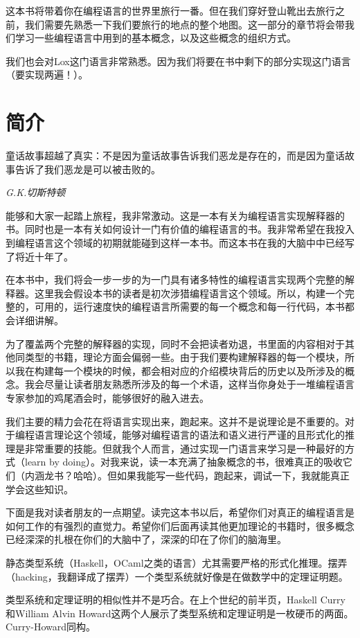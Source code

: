 \documentclass[cn,10pt,math=newtx,citestyle=gb7714-2015,bibstyle=gb7714-2015]{elegantbook}
\begin{document}
这本书将带着你在编程语言的世界里旅行一番。但在我们穿好登山靴出去旅行之前，我们需要先熟悉一下我们要旅行的地点的整个地图。这一部分的章节将会带我们学习一些编程语言中用到的基本概念，以及这些概念的组织方式。

我们也会对Lox这门语言非常熟悉。因为我们将要在书中剩下的部分实现这门语言（要实现两遍！）。

\chapter{简介}

\epigraph{童话故事超越了真实：不是因为童话故事告诉我们恶龙是存在的，而是因为童话故事告诉了我们恶龙是可以被击败的。}{\textit{G.K.切斯特顿}}

能够和大家一起踏上旅程，我非常激动。这是一本有关为编程语言实现解释器的书。同时也是一本有关如何设计一门有价值的编程语言的书。我非常希望在我投入到编程语言这个领域的初期就能碰到这样一本书。而这本书在我的大脑中中已经写了将近十年了。

在本书中，我们将会一步一步的为一门具有诸多特性的编程语言实现两个完整的解释器。这里我会假设本书的读者是初次涉猎编程语言这个领域。所以，构建一个完整的，可用的，运行速度快的编程语言所需要的每一个概念和每一行代码，本书都会详细讲解。

为了覆盖两个完整的解释器的实现，同时不会把读者劝退，书里面的内容相对于其他同类型的书籍，理论方面会偏弱一些。由于我们要构建解释器的每一个模块，所以我在构建每一个模块的时候，都会相对应的介绍模块背后的历史以及所涉及的概念。我会尽量让读者朋友熟悉所涉及的每一个术语，这样当你身处于一堆编程语言专家参加的鸡尾酒会时，能够很好的融入进去。

我们主要的精力会花在将语言实现出来，跑起来。这并不是说理论是不重要的。对于编程语言理论这个领域，能够对编程语言的语法和语义进行严谨的且形式化的推理是非常重要的技能。但就我个人而言，通过实现一门语言来学习是一种最好的方式（learn by doing）。对我来说，读一本充满了抽象概念的书，很难真正的吸收它们（内涵龙书？哈哈）。但如果我能写一些代码，跑起来，调试一下，我就能真正学会这些知识。

下面是我对读者朋友的一点期望。读完这本书以后，希望你们对真正的编程语言是如何工作的有强烈的直觉力。希望你们后面再读其他更加理论的书籍时，很多概念已经深深的扎根在你们的大脑中了，深深的印在了你们的脑海里。

\begin{tcolorbox}
   
静态类型系统（Haskell，OCaml之类的语言）尤其需要严格的形式化推理。摆弄（hacking，我翻译成了摆弄）一个类型系统就好像是在做数学中的定理证明题。

类型系统和定理证明的相似性并不是巧合。在上个世纪的前半页，Haskell Curry和William Alvin Howard这两个人展示了类型系统和定理证明是一枚硬币的两面。Curry-Howard同构。

\end{tcolorbox}
\end{document}
